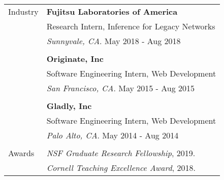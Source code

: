 \documentclass[letterpaper,10pt,oneside]{article}
\begin{document}
\begin{tabular}{@{} l l}
 \Large{Industry}
       & \textbf{Fujitsu Laboratories of America} \\
       & Research Intern, Inference for Legacy Networks \\
       & \textit{Sunnyvale, CA}. May 2018 - Aug 2018 \\
       & \\
       & \textbf{Originate, Inc} \\
       & Software Engineering Intern, Web Development \\
       & \textit{San Francisco, CA}. May 2015 - Aug 2015 \\
       & \\
       & \textbf{Gladly, Inc} \\
       & Software Engineering Intern, Web Development \\
            & \textit{Palo Alto, CA}. May 2014 - Aug 2014 \\ \\
 \Large{Awards} 
            & \textit{NSF Graduate Research Fellowship}, 2019. \\
            & \textit{Cornell Teaching Excellence Award}, 2018.

\end{tabular}
\end{document}
